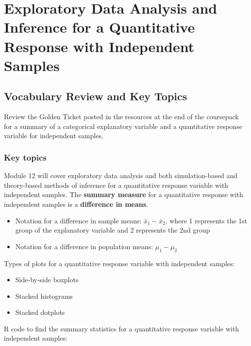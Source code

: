 \documentclass[
]{report}
\begin{document}
\nocite{*}

\chapter{Exploratory Data Analysis and Inference for a Quantitative Response with Independent Samples}\label{exploratory-data-analysis-and-inference-for-a-quantitative-response-with-independent-samples}

\section{Vocabulary Review and Key Topics}\label{vocabulary-review-and-key-topics}

Review the Golden Ticket posted in the resources at the end of the coursepack for a summary of a categorical explanatory variable and a quantitative response variable for independent samples.

\subsection{Key topics}\label{key-topics}

Module 12 will cover exploratory data analysis and both simulation-based and theory-based methods of inference for a quantitative response variable with independent samples. The \textbf{summary measure} for a quantitative response with independent samples is a \textbf{difference in means}.

\begin{itemize}
\item
  Notation for a difference in sample means: \(\bar{x}_1 - \bar{x}_2\), where 1 represents the 1st group of the explanatory variable and 2 represents the 2nd group
\item
  Notation for a difference in population means: \(\mu_1 - \mu_2\)
\end{itemize}

Types of plots for a quantitative response variable with independent samples:

\begin{itemize}
\item
  Side-by-side boxplots
\item
  Stacked histograms
\item
  Stacked dotplots
\end{itemize}

R code to find the summary statistics for a quantitative response variable with independent samples:
\end{document}
